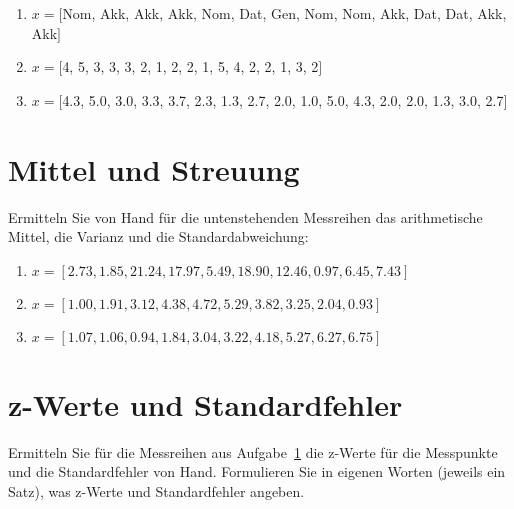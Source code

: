 \begin{enumerate}
  \item $x=[$Nom, Akk, Akk, Akk, Nom, Dat, Gen, Nom, Nom, Akk, Dat, Dat, Akk, Akk$]$
  \item $x=[$4, 5, 3, 3, 3, 2, 1, 2, 2, 1, 5, 4, 2, 2, 1, 3, 2$]$
  \item $x=[$4.3, 5.0, 3.0, 3.3, 3.7, 2.3, 1.3, 2.7, 2.0, 1.0, 5.0, 4.3, 2.0, 2.0, 1.3, 3.0, 2.7$]$
\end{enumerate}

\newpage

\section{Mittel und Streuung}
\label{sec:mittelstreu}

Ermitteln Sie von Hand für die untenstehenden Messreihen das arithmetische Mittel, die Varianz und die Standardabweichung:

\begin{enumerate}
  \item $x=[2.73, 1.85, 21.24, 17.97, 5.49, 18.90, 12.46, 0.97, 6.45, 7.43]$
  \item $x=[1.00, 1.91, 3.12, 4.38, 4.72, 5.29, 3.82, 3.25, 2.04, 0.93]$
  \item $x=[1.07, 1.06, 0.94, 1.84, 3.04, 3.22, 4.18, 5.27, 6.27, 6.75]$
\end{enumerate}

\section{z-Werte und Standardfehler}

Ermitteln Sie für die Messreihen aus Aufgabe~\ref{sec:mittelstreu} die z-Werte für die Messpunkte und die Standardfehler von Hand.
Formulieren Sie in eigenen Worten (jeweils ein Satz), was z-Werte und Standardfehler angeben.

